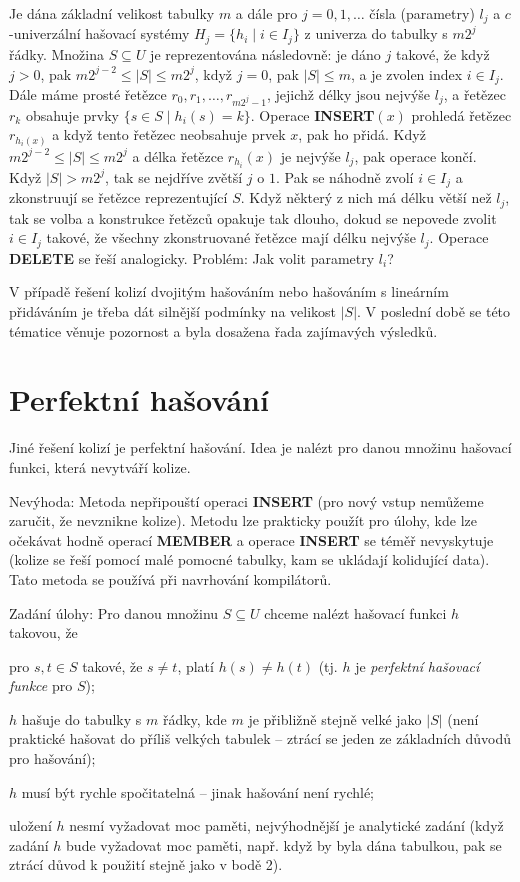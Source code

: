 \documentclass[a4paper,12pt]{article}
\begin{document}
Je dána základní velikost tabulky $m$ a dále pro $
j=0,1,\dots$ 
čísla (parametry) $l_j$ a $c$-univer\-zál\-ní hašovací systémy 
$H_j=\{h_i\mid i\in I_j\}$ z univerza do tabulky s $m2^j$ řádky.\newline 
Množina $S\subseteq U$ je reprezentována následovně:  je dáno $
j$ 
tako\-vé, že když $j>0$, pak $m2^{j-2}\le |S|\le m2^j$, když $
j=0$, pak 
$|S|\le m$, a je zvolen index $i\in I_j$.  Dále máme prosté řetězce 
$r_0,r_1,\dots,r_{m2^j-1}$, jejichž délky jsou nejvýše $
l_j$, a řetězec $r_k$ 
obsahuje prvky $\{s\in S\mid h_i(s)=k\}$.\newline 
Operace {\bf INSERT$(x)$} prohledá řetězec $r_{h_i(x)}$ a když tento 
ře\-tě\-zec neobsahuje prvek $x$, pak ho přidá.  Když 
$m2^{j-2}\le |S|\le m2^j$ a délka řetězce $r_{h_i}(x)$ je nejvýše $
l_j$, pak 
operace končí.  Když $|S|>m2^j$, tak se nejdříve zvětší $
j$ o $1$.  
Pak se náhodně zvolí $i\in I_j$ a zkonstruují se řetězce 
reprezentující $S$.  Když některý z nich má délku větší než $
l_j$, 
tak se volba a konstrukce řetězců opakuje tak dlouho, 
dokud se nepovede zvolit $i\in I_j$ takové, že všechny 
zkonstruované řetězce mají délku nejvýše $l_j$.  Operace {\bf DELETE }
se řeší analogicky.\newline 
Problém:  Jak volit parametry $l_i$?  

V případě řešení 
kolizí dvojitým hašováním nebo hašováním s 
lineárním přidáváním je třeba dát silnější podmínky na velikost $
|S|$. V poslední době se této tématice 
věnuje pozornost a byla dosažena řada zajímavých výsledků.

\section{Perfektní hašování}

Jiné řešení kolizí je perfektní hašování. Idea 
je nalézt pro danou množinu hašovací funkci, která 
nevytváří kolize.

Nevýhoda: Metoda nepřipouští operaci {\bf INSERT }
(pro nový vstup nemůžeme zaručit, že nevznikne  
kolize). Metodu lze prakticky použít pro úlohy, kde lze 
očekávat hodně operací {\bf MEMBER} a operace {\bf INSERT} se 
téměř nevyskytuje (kolize se řeší pomocí malé pomocné 
tabulky, kam se ukládají kolidují\-cí data). Tato metoda se 
používá při navrhování kompilátorů.

Zadání úlohy: Pro danou množinu $S\subseteq 
U$ chceme 
nalézt hašo\-va\-cí funkci $h$ takovou, že
\roster
\item
pro $s,t\in S$ takové, že $s\ne t$, platí $h(s)\ne h(t)$ (tj. $
h$ je \emph{perfektní} \emph{hašovací} \emph{funkce} pro 
$S$); 
\item
$h$ hašuje do tabulky s $m$ řádky, kde $m$ je přibližně 
stejně velké jako $|S|$ (není praktické hašovat do příliš 
velkých tabulek -- ztrácí se jeden ze základních 
důvodů pro hašování); 
\item
$h$ musí být rychle spočitatelná -- jinak hašování 
není rychlé;
\item
uložení $h$ nesmí vyžadovat moc paměti, 
nejvýhodnější je ana\-lytické zadání (když zadání $
h$ bude 
vyžadovat moc paměti, např. když by byla dána tabulkou, 
pak se ztrácí důvod k použití stejně jako v 
bodě 2).
\endroster
\end{document}
